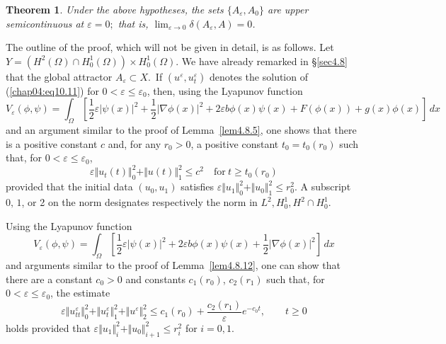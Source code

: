 \documentclass{surv-l}
\theoremstyle{plain}
\newtheorem{theorem}{Theorem}[section]
\theoremstyle{definition}
\numberwithin{equation}{section}
\numberwithin{figure}{chapter}
\begin{document}
\begin{theorem}\label{thm4.10.6} Under the above hypotheses, the sets $\{A_{\varepsilon}, A_{0}\}$ are upper semicontinuous at $\varepsilon=0;$ that is, $\lim_{\varepsilon\rightarrow 0}\delta(A_{\varepsilon}, A)=0$.
\end{theorem}

The outline of the proof, which will not be given in detail, is as follows. Let $Y=(H^{2}(\Omega)\cap H_{0}^{1}(\Omega))\times H_{0}^{1}(\Omega)$. We have already remarked in \S \ref{sec4.8} that the global attractor $A_{\varepsilon}\subset X$.\, If $(u^{\varepsilon}, u_{t}^{\varepsilon})$ denotes the solution of (\ref{chap04:eq10.11}) for $0<\varepsilon\leq\varepsilon_{0}$, then, using the Lyapunov function
\begin{equation*}
V_{\varepsilon}(\phi, \psi)=\int_{\Omega}\left[\frac{1}{2}\varepsilon|\psi(x)|^{2}+\frac{1}{2}|\nabla\phi(x)|^{2}+2\varepsilon b\phi(x)\psi(x)+F(\phi(x))+g(x)\phi(x)\right]\,dx
\end{equation*}
and an argument similar to the proof of Lemma~\ref{lem4.8.5}, one shows that there is a positive constant $c$ and, for any $r_{0}>0$, a positive constant $t_{0}=t_{0}(r_{0})$ such that, for $0<\varepsilon\leq\varepsilon_{0}$,
\begin{equation}\label{chap04:eq10.15}
\varepsilon\Vert u_{t}(t)\Vert_{0}^{2}+\Vert u(t)\Vert_{1}^{2}\leq c^{2}\quad \mathrm{for}\ t\geq t_{0}(r_{0})
\end{equation}
provided that the initial data $(u_{0}, u_{1})$ satisfies $\varepsilon\Vert u_{1}\Vert_{0}^{2}+\Vert u_{0}\Vert_{1}^{2}\leq r_{0}^{2}$. A subscript $0,\,1$, or 2 on the norm designates respectively the norm in $L^{2}, H_{0}^{1}, H^{2}\cap H_{0}^{1}$.

Using the Lyapunov function
\begin{equation*}
V_{\varepsilon}(\phi, \psi)=\int_{\Omega}\left[\frac{1}{2}\varepsilon|\psi(x)|^{2}+2\varepsilon b\phi(x)\psi(x)+\frac{1}{2}|\nabla\phi(x)|^{2}\right]\,dx
\end{equation*}
and arguments similar to the proof of Lemma~\ref{lem4.8.12}, one can show that there are a constant $c_{0}>0$ and constants $c_{1}(r_{0})$, $c_{2}(r_{1})$ such that, for $0<\varepsilon\leq\varepsilon_{0}$, the estimate
\begin{equation}\label{chap04:eq10.16}
\varepsilon\Vert u_{tt}^{\varepsilon}\Vert_{0}^{2}+\Vert u_{t}^{\varepsilon}\Vert_{1}^{2}+\Vert u^{\varepsilon}\Vert_{2}^{2}\leq c_{1}(r_{0})+\frac{c_{2}(r_{1})}{\varepsilon}e^{-c_{0}t},\quad\quad t\geq 0
\end{equation}
holds provided that $\varepsilon\Vert u_{1}\Vert_{i}^{2}+\Vert u_{0}\Vert_{i+1}^{2}\leq r_{i}^{2}$ for $i=0,1$.
\end{document}
